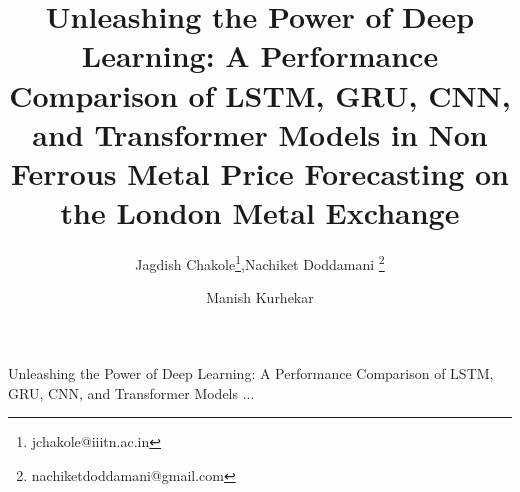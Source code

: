 \documentclass{ws-ijait}
\begin{document}
{Unleashing the Power of Deep Learning: A Performance Comparison of LSTM, GRU, CNN, and Transformer Models ...}


%
\catchline{}{}{}{}{}
%

\title{Unleashing the Power of Deep Learning: A Performance Comparison of LSTM, GRU, CNN, and Transformer Models in Non Ferrous Metal Price Forecasting on the London Metal Exchange}

\author{Jagdish Chakole\footnote{jchakole@iiitn.ac.in},\hspace{0.2cm}Nachiket Doddamani \footnote{nachiketdoddamani@gmail.com}}

\address{Department of Computer Science and Engineering, \\Indian Institute of Information Technology,\\
 Nagpur, Maharashtra 441108,
India}



\author{Manish Kurhekar}

\address{Department of Computer Science and Engineering, \\Visvesvaraya National Institute of Technology,\\
	Nagpur, Maharashtra 440010,
	India\\
	manishkurhekar@cse.vnit.ac.in}

\maketitle

\begin{history}
\end{history}
\end{document}
